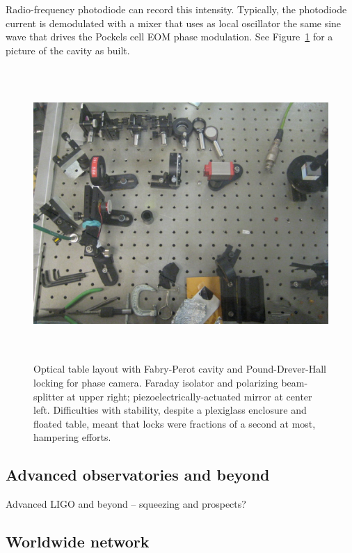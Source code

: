 Radio-frequency photodiode can record this intensity.
Typically, the photodiode current is demodulated with a mixer that uses as local oscillator the same sine wave that drives the Pockels cell EOM phase modulation.
See Figure~\ref{phase_camera_optical_table} for a picture of the cavity as built.

\begin{figure}
\begin{center}
\includegraphics[height=111mm, width=148mm]{Optical_table_phase_camera.eps}
\caption{Optical table layout with Fabry-Perot cavity and Pound-Drever-Hall locking for phase camera. Faraday isolator and polarizing beam-splitter at upper right; piezoelectrically-actuated mirror at center left. Difficulties with stability, despite a plexiglass enclosure and floated table, meant that locks were fractions of a second at most, hampering efforts.}
\label{phase_camera_optical_table}
\end{center}
\end{figure}

        \subsection{Advanced observatories and beyond}
        \label{advanced}
  
            Advanced LIGO and beyond -- squeezing and prospects?

        \subsection{Worldwide network}
        \label{worldwide}
 
